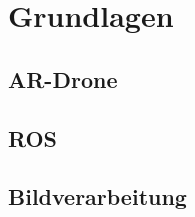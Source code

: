 \chapter{Grundlagen}
\label{cha:Fundamentals}

\section{AR-Drone}

\section{ROS}

\section{Bildverarbeitung}
